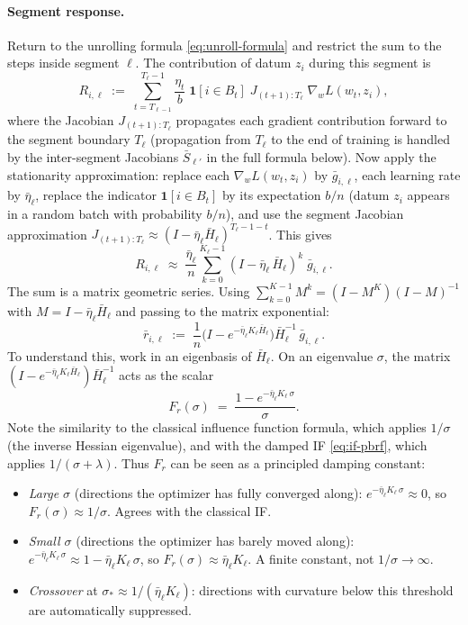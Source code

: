 \documentclass[11pt]{article}
\begin{document}
\paragraph{Segment response.} Return to the unrolling formula \eqref{eq:unroll-formula} and restrict the sum to the steps inside segment $\ell$. The contribution of datum $z_i$ during this segment is
\begin{equation}\label{eq:segment-response-exact}
  R_{i,\ell} \;:=\; \sum_{t=T_{\ell-1}}^{T_\ell - 1}\frac{\eta_t}{b}\;\mathbf{1}[i\in B_t]\;J_{(t+1):T_\ell}\;\nabla_w L(w_t,z_i),
\end{equation}
where the Jacobian $J_{(t+1):T_\ell}$ propagates each gradient contribution forward to the segment boundary $T_\ell$ (propagation from $T_\ell$ to the end of training is handled by the inter-segment Jacobians $\bar{S}_{\ell'}$ in the full formula below). Now apply the stationarity approximation: replace each $\nabla_w L(w_t,z_i)$ by $\bar{g}_{i,\ell}$, each learning rate by $\bar\eta_\ell$, replace the indicator $\mathbf{1}[i\in B_t]$ by its expectation $b/n$ (datum $z_i$ appears in a random batch with probability $b/n$), and use the segment Jacobian approximation $J_{(t+1):T_\ell} \approx (I - \bar\eta_\ell\bar{H}_\ell)^{T_\ell - 1 - t}$. This gives
\[
  R_{i,\ell} \;\approx\; \frac{\bar\eta_\ell}{n}\sum_{k=0}^{K_\ell - 1}(I - \bar\eta_\ell\,\bar{H}_\ell)^{k}\;\bar{g}_{i,\ell}.
\]
The sum is a matrix geometric series. Using $\sum_{k=0}^{K-1}M^k = (I - M^K)(I-M)^{-1}$ with $M = I - \bar\eta_\ell\bar{H}_\ell$ and passing to the matrix exponential:
\begin{equation}\label{eq:segment-response}
  \bar{r}_{i,\ell} \;:=\; \frac{1}{n}\bigl(I - e^{-\bar\eta_\ell K_\ell \bar{H}_\ell}\bigr)\bar{H}_\ell^{-1}\,\bar{g}_{i,\ell}.
\end{equation}
To understand this, work in an eigenbasis of $\bar{H}_\ell$. On an eigenvalue $\sigma$, the matrix $(I - e^{-\bar\eta_\ell K_\ell \bar{H}_\ell})\bar{H}_\ell^{-1}$ acts as the scalar
\begin{equation}\label{eq:filter-fr}
  F_r(\sigma) \;=\; \frac{1 - e^{-\bar\eta_\ell K_\ell\,\sigma}}{\sigma}.
\end{equation}
Note the similarity to the classical influence function formula, which applies $1/\sigma$ (the inverse Hessian eigenvalue), and with the damped IF \eqref{eq:if-pbrf}, which applies $1/(\sigma + \lambda)$. Thus $F_r$ can be seen as a principled damping constant:
\begin{itemize}
  \item \emph{Large $\sigma$} (directions the optimizer has fully converged along): $e^{-\bar\eta_\ell K_\ell\,\sigma} \approx 0$, so $F_r(\sigma) \approx 1/\sigma$. Agrees with the classical IF\@.
  \item \emph{Small $\sigma$} (directions the optimizer has barely moved along): $e^{-\bar\eta_\ell K_\ell\,\sigma} \approx 1 - \bar\eta_\ell K_\ell\,\sigma$, so $F_r(\sigma) \approx \bar\eta_\ell K_\ell$. A finite constant, not $1/\sigma \to \infty$.
  \item \emph{Crossover} at $\sigma_* \approx 1/(\bar\eta_\ell K_\ell)$: directions with curvature below this threshold are automatically suppressed.
\end{itemize}
\end{document}
